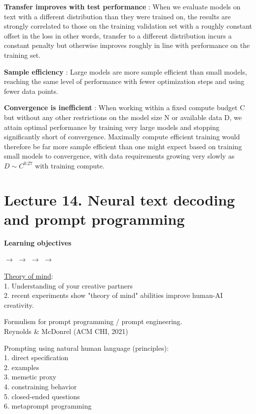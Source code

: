 \documentclass[12pt,a4paper]{article}
\begin{document}
\textbf{Transfer improves with test performance} : When we evaluate models on text with a different distribution than they were trained on, the results are strongly correlated to those on the training validation set with a roughly constant offset in the loss in other words, transfer to a different distribution incurs a constant penalty but otherwise improves roughly in line with performance on the training set.

\textbf{Sample efficiency} : Large models are more sample efficient than small models, reaching the same level of performance with fewer optimization steps and using fewer data points.

\textbf{Convergence is inefficient} : When working within a fixed compute budget C but without any other restrictions on the model size N or available data D, we attain optimal performance by training very large models and stopping significantly short of convergence. Maximally compute efficient training would therefore be far more sample efficient than one might expect based on training small models to convergence, with data requirements growing very slowly as $D\sim C^{0.27}$ with training compute.


\section{Lecture 14. Neural text decoding and prompt programming}

\textbf{Learning objectives}

$\longrightarrow$  $\longrightarrow$  $\longrightarrow$  $\longrightarrow$

\vspace{0.5cm}
\underline{Theory of mind}:\\
1. Understanding of your creative partners\\  
2. recent experiments show "theory of mind" abilities improve human-AI creativity.

\vspace{0.5cm}
Formulism for prompt programming / prompt engineering.\\
Reynolds \& McDonrel (ACM CHI, 2021)

Prompting using natural human language (principles):\\
1. direct specification \\
2. examples \\
3. memetic proxy \\
4. constraining behavior \\
5. closed-ended questions \\
6. metaprompt programming 
\end{document}
